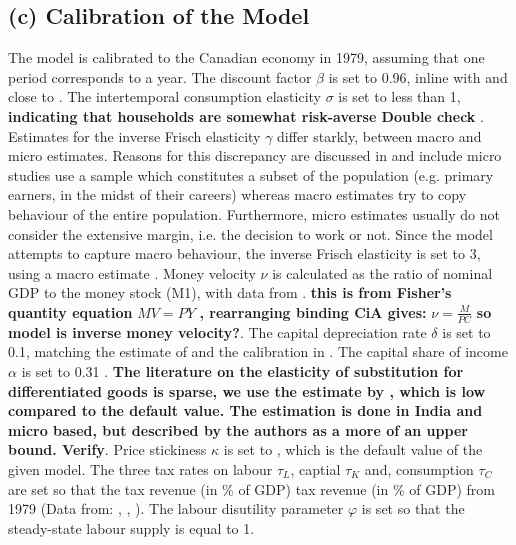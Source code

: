 \documentclass[12pt]{article}
\begin{document}
\subsection*{(c) Calibration of the Model}
The model is calibrated to the Canadian economy in 1979, assuming that one period corresponds to a year. 
The discount factor $\beta$ is set to 0.96, inline with \textcite{someOilDemandSupply2023} and close to \textcite{corriganToTEMIIIBank2021}. 
The intertemporal consumption elasticity $\sigma$ is set to less than 1, \textbf{indicating that households are somewhat risk-averse Double check} \parencite{thimmeIntertemporalSubstitutionConsumption2017}.
Estimates for the inverse Frisch elasticity $\gamma$ differ starkly, between macro and micro estimates. Reasons for this discrepancy are discussed in \cite{...} and 
include micro studies use a sample which constitutes a subset of the population (e.g. primary earners, in the midst of their careers) whereas macro estimates try
 to copy behaviour of the entire population. Furthermore, micro estimates usually do not consider the extensive margin, i.e. the decision to work or not. Since the model attempts to capture
macro behaviour, the inverse Frisch elasticity is set to 3, using a macro estimate \cite{...}. Money velocity $\nu$ is calculated as the ratio of nominal GDP to the money stock (M1), with data from \cite{...}.
\textbf{this is from Fisher's quantity equation} $MV =PY$ \textbf{, rearranging binding CiA gives: }$\nu = \frac{M}{PC}$ \textbf{so model is inverse money velocity?}.
The capital depreciation rate $\delta$ is set to 0.1, matching the estimate of \cite{...} and the calibration in \cite{...}.
The capital share of income $\alpha$ is set to 0.31 \cite{...}. 
\textbf{The literature on the elasticity of substitution for differentiated goods is sparse, we use the estimate by \cite{...}, which is low compared to the default value. The estimation is done in India and 
micro based, but described by the authors as a more of an upper bound. Verify}. 
Price stickiness $\kappa$ is set to , which is the default value of the given model.
The three tax rates on labour $\tau_L$, captial $\tau_K$ and, consumption $\tau_C$ are set so that the tax revenue (in \% of GDP) tax revenue (in \% of GDP) from 1979 (Data from: \cite{worldbankgroupWorldBankNational}, \cite{michiganuniversityrossschoolofbusinessWorldTaxDatabase}, \cite{InflationCalculatorFederal}).
The labour disutility parameter $\varphi$ is set so that the steady-state labour supply is equal to 1.
\end{document}
